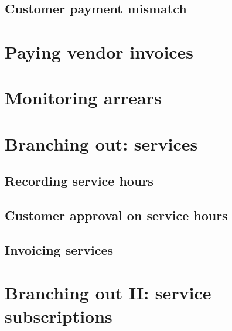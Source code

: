 \section{Customer payment mismatch}





\chapter{Paying vendor invoices}
\label{cha:vendor-payments}




\chapter{Monitoring arrears}
\label{cha:monitoring-arrears}


\chapter{Branching out: services}



\section{Recording service hours}

\section{Customer approval on service hours}

\section{Invoicing services}

\chapter{Branching out II: service subscriptions}


